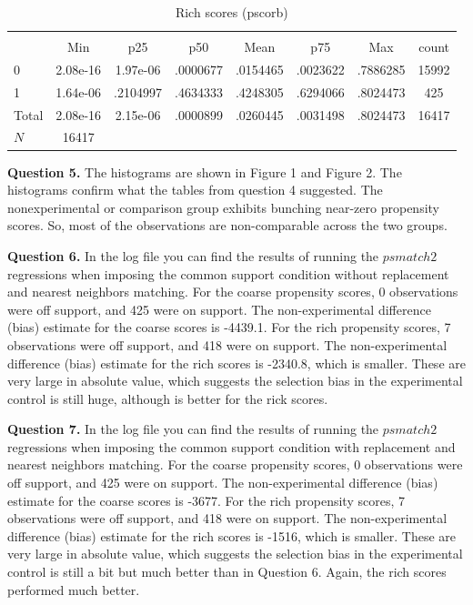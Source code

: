 \documentclass{article}
\theoremstyle{definition}
\begin{document}
\begin{table}[htbp]\centering
\def\sym#1{\ifmmode^{#1}\else\(^{#1}\)\fi}
\caption{Rich scores (pscorb)}
\begin{tabular}{l*{1}{ccccccc}}
\hline\hline
          &\multicolumn{7}{c}{}                                                 \\
          &      Min&      p25&      p50&     Mean&      p75&      Max&    count\\
\hline
0         & 2.08e-16& 1.97e-06& .0000677& .0154465& .0023622& .7886285&    15992\\
1         & 1.64e-06& .2104997& .4634333& .4248305& .6294066& .8024473&      425\\
Total     & 2.08e-16& 2.15e-06& .0000899& .0260445& .0031498& .8024473&    16417\\
\hline
\(N\)     &    16417&         &         &         &         &         &         \\
\hline\hline
\end{tabular}
\end{table}

\hspace{0.41cm} \textbf{Question 5.} The histograms are shown in Figure 1 and Figure 2. The histograms confirm what the tables from question 4 suggested. The nonexperimental or comparison group exhibits bunching near-zero propensity scores. So, most of the observations are non-comparable across the two groups. 



\hspace{0.41cm} \textbf{Question 6.} In the log file you can find the results of running the $psmatch2$ regressions when imposing the common support condition without replacement and nearest neighbors matching. For the coarse propensity scores, 0 observations were off support, and 425 were on support.  The non-experimental difference (bias) estimate for the coarse scores is -4439.1.  For the rich propensity scores, 7 observations were off support, and 418 were on support. The non-experimental difference (bias) estimate for the rich scores is -2340.8, which is smaller. These are very large in absolute value, which suggests the selection bias in the experimental control is still huge, although is better for the rick scores. 

 \hspace{0.41cm} \textbf{Question 7.} In the log file you can find the results of running the $psmatch2$ regressions when imposing the common support condition with replacement and nearest neighbors matching.  For the coarse propensity scores, 0 observations were off support, and 425 were on support.  The non-experimental difference (bias) estimate for the coarse scores is -3677.  For the rich propensity scores, 7 observations were off support, and 418 were on support. The non-experimental difference (bias) estimate for the rich scores is -1516, which is smaller. These are very large in absolute value, which suggests the selection bias in the experimental control is still a bit but much better than in Question 6. Again, the rich scores performed much better. 
 
\end{document}
